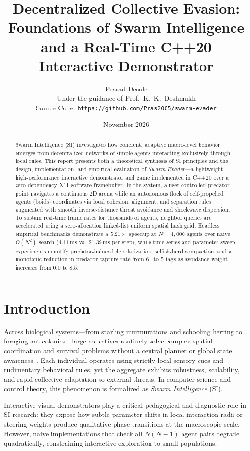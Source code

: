 \documentclass[10pt,twocolumn]{article}
\title{\textbf{Decentralized Collective Evasion: Foundations of Swarm Intelligence and a Real-Time C++20 Interactive Demonstrator}}
\author{Prasad Desale \\ \small Under the guidance of Prof.\ K.\ K.\ Deshmukh \\ \small Source Code: \href{https://github.com/Pras2005/swarm-evader}{\texttt{https://github.com/Pras2005/swarm-evader}}}
\date{November 2026}
\begin{document}
\maketitle

\begin{abstract}
Swarm Intelligence (SI) investigates how coherent, adaptive macro-level behavior emerges from decentralized networks of simple agents interacting exclusively through local rules. This report presents both a theoretical synthesis of SI principles and the design, implementation, and empirical evaluation of \emph{Swarm Evader}---a lightweight, high-performance interactive demonstrator and game implemented in C++20 over a zero-dependency X11 software framebuffer. In the system, a user-controlled predator point navigates a continuous 2D arena while an autonomous flock of self-propelled agents (boids) coordinates via local cohesion, alignment, and separation rules augmented with smooth inverse-distance threat avoidance and shockwave dispersion. To sustain real-time frame rates for thousands of agents, neighbor queries are accelerated using a zero-allocation linked-list uniform spatial hash grid. Headless empirical benchmarks demonstrate a $5.21\times$ speedup at $N = 4{,}000$ agents over naive $O(N^2)$ search ($4.11\,\text{ms}$ vs.\ $21.39\,\text{ms}$ per step), while time-series and parameter-sweep experiments quantify predator-induced depolarization, selfish-herd compaction, and a monotonic reduction in predator capture rate from $61$ to $5$ tags as avoidance weight increases from $0.0$ to $8.5$.
\end{abstract}

\section{Introduction}
Across biological systems---from starling murmurations and schooling herring to foraging ant colonies---large collectives routinely solve complex spatial coordination and survival problems without a central planner or global state awareness~\cite{bonabeau1999swarm}. Each individual operates using strictly local sensory cues and rudimentary behavioral rules, yet the aggregate exhibits robustness, scalability, and rapid collective adaptation to external threats. In computer science and control theory, this phenomenon is formalized as \emph{Swarm Intelligence} (SI).

Interactive visual demonstrators play a critical pedagogical and diagnostic role in SI research: they expose how subtle parameter shifts in local interaction radii or steering weights produce qualitative phase transitions at the macroscopic scale. However, naive implementations that check all $N(N-1)$ agent pairs degrade quadratically, constraining interactive exploration to small populations.
\end{document}
